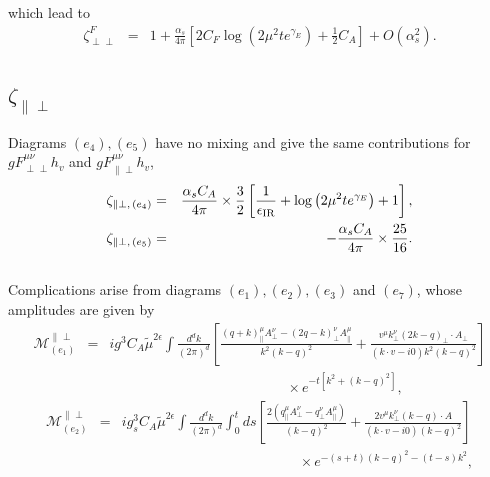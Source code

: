 which lead to 
\begin{eqnarray}
\label{eq:resultgluonvertexF}
\zeta_{\perp\perp}^F&= &1+ \frac{\alpha_s}{4\pi} \left[2C_F\log\left(2\mu^2 te^{\gamma_E}\right)+\frac{1}{2}C_A\right] + O(\alpha_s^2).
\end{eqnarray}
\subsection{$\zeta_{\|\perp}$}
Diagrams $(e_4), (e_5)$ have no mixing and give the same contributions for $gF^{\mu\nu}_{\perp\perp}h_v$ and $gF^{\mu\nu}_{\|\perp}h_v$, 
\begin{eqnarray}
\label{eq:e4pperpresult}
\zeta_{\|\perp,\, (e_4)}&=&\frac{\alpha_sC_A}{4\pi}\times \frac{3}{2} \left[\frac{1}{\epsilon_{\rm IR}}+\log\left(2\mu^2 te^{\gamma_E}\right) +1\right],\\
\label{eq:e5pperpresult}
\zeta_{\|\perp,\, (e_5)}
&=&- \frac{\alpha_sC_A}{4\pi}\times\frac{25}{16}.
\end{eqnarray}
\\
Complications arise from diagrams $(e_1), (e_2), (e_3)$ and $(e_7)$, whose amplitudes are given by
\begin{eqnarray}
\label{eq:e1pperp}
\mathcal{M}_{(e_1)}^{\|\perp}
&=&ig^3C_A\tilde{\mu}^{2\epsilon}\int\frac{d^dk}{(2\pi)^d}\left[\frac{(q+k)^{\mu}_{\|} A_{\perp}^{\nu}-(2q-k)^{\nu}_{\perp} A^{\mu}_{\|}}{k^2(k-q)^2} +\frac{v^{\mu}k_{\perp}^{\nu}(2k-q)_{\perp}\cdot A_{\perp} }{(k\cdot v- i0)k^2(k-q)^2} \right]\nonumber\\
&&\, \, \, \, \, \, \, \, \, \, \, \, \, \, \, \, \, \, \, \, \, \, \, \, \, \, \, \, \, \, \, \, \, \, \, \, \, \, \, \, \, \, \, \, \, \, \, \, \, \,  \, \, \, \, \, \, \, \, \, \, \, \,  \, \, \, \, \, \, \, \, \, \, \, \,  \, \, \times e^{-t\left[k^2+(k-q)^2\right]},
\end{eqnarray}
\begin{eqnarray}
\label{eq:e2pperp}
\mathcal{M}_{(e_2)}^{\|\perp} 
&=&ig_s^3C_A\tilde{\mu}^{2\epsilon}\int\frac{d^dk}{(2\pi)^d}\int_0^t ds \left[\frac{2\left(q^{\mu}_{\|}A^{\nu}_{\perp} - q_{\perp}^{\nu}A_{\|}^{\mu}\right)}{(k-q)^2} +\frac{2v^{\mu}k_{\perp}^{\nu}(k-q)\cdot A}{(k\cdot v-i0)(k-q)^2}\right]\nonumber\\
&&\, \, \, \, \, \, \, \, \, \, \, \, \, \, \, \, \, \, \, \, \, \, \, \, \, \, \, \, \, \, \, \, \, \, \, \, \, \, \, \, \, \, \, \, \, \, \, \, \, \,  \, \, \, \, \, \, \, \, \, \, \, \,  \, \, \, \, \, \, \, \, \, \, \, \,  \, \, \times e^{-(s+t)(k-q)^2-(t-s)k^2},
\end{eqnarray}
